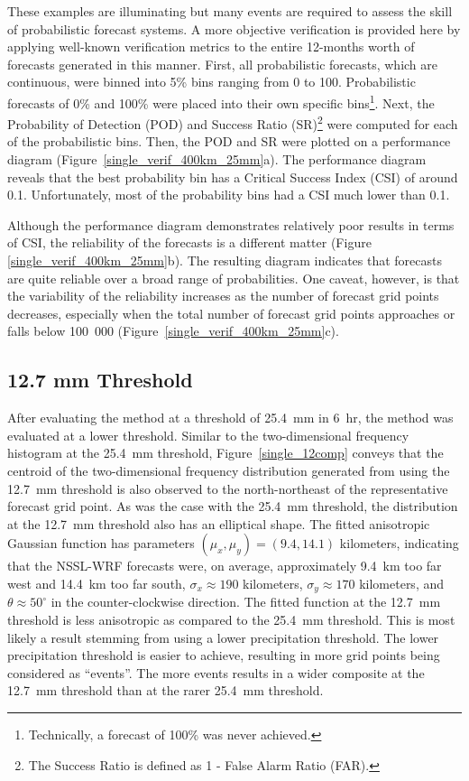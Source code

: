 These examples are illuminating but many events are required to assess the skill of probabilistic forecast systems.
A more objective verification is provided here by applying well-known verification metrics to the entire 12-months worth of forecasts generated in this manner.
First, all probabilistic forecasts, which are continuous, were binned into 5\% bins ranging from 0 to 100.
Probabilistic forecasts of 0\% and 100\% were placed into their own specific bins\footnote{Technically, a forecast of 100\% was never achieved.}.
Next, the Probability of Detection (POD) and Success Ratio (SR)\footnote{The Success Ratio is defined as 1 - False Alarm Ratio (FAR).} were computed for each of the probabilistic bins.
Then, the POD and SR were plotted on a performance diagram \citep{Roebber2009} \mbox{(Figure \ref{single_verif_400km_25mm}a)}.
The performance diagram reveals that the best probability bin has a Critical Success Index (CSI) of around 0.1.
Unfortunately, most of the probability bins had a CSI much lower than 0.1.

Although the performance diagram demonstrates relatively poor results in terms of CSI, the reliability of the forecasts is a different matter (Figure \mbox{\ref{single_verif_400km_25mm}b)}.
The resulting diagram indicates that forecasts are quite reliable over a broad range of probabilities.
One caveat, however, is that the variability of the reliability increases as the number of forecast grid points decreases, especially when the total number of forecast grid points approaches or falls below \mbox{100 000} \mbox{(Figure \ref{single_verif_400km_25mm}c)}.




\subsection{12.7 mm Threshold}
\label{dresults_12.7mm}

After evaluating the method at a threshold of \mbox{25.4 mm} in \mbox{6 hr}, the method was evaluated at a lower threshold.
Similar to the two-dimensional frequency histogram at the \mbox{25.4 mm} threshold, \mbox{Figure \ref{single_12comp}} conveys that the centroid of the two-dimensional frequency distribution generated from using the \mbox{12.7 mm} threshold is also observed to the north-northeast of the representative forecast grid point.
As was the case with the \mbox{25.4 mm} threshold, the distribution at the \mbox{12.7 mm} threshold also has an elliptical shape.
The fitted anisotropic Gaussian function has parameters $(\mu_x, \mu_y) = (9.4, 14.1)$ kilometers, indicating that the NSSL-WRF forecasts were, on average, approximately \mbox{9.4 km} too far west and \mbox{14.4 km} too far south, $\sigma_x \approx 190$ kilometers, $\sigma_y \approx 170$ kilometers, and $\theta \approx 50^{\circ}$ in the counter-clockwise direction.
The fitted function at the \mbox{12.7 mm} threshold is less anisotropic as compared to the \mbox{25.4 mm} threshold.
This is most likely a result stemming from using a lower precipitation threshold.
The lower precipitation threshold is easier to achieve, resulting in more grid points being considered as ``events''.
The more events results in a wider composite at the \mbox{12.7 mm} threshold than at the rarer \mbox{25.4 mm} threshold.


